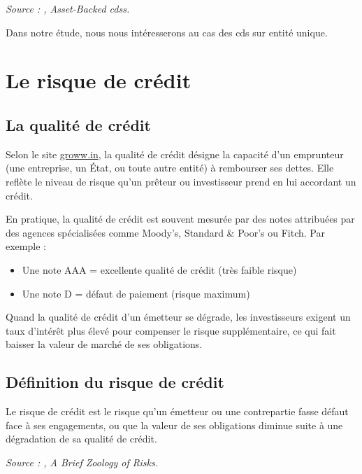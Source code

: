 \noindent\textit{Source : \cite{credit_default_swap}, Asset-Backed \gls{cds}s.}

\medskip

\noindent Dans notre étude, nous nous intéresserons au cas des \gls{cds} sur entité unique.


\section{Le risque de crédit}

\subsection{La qualité de crédit}

\begin{definition}
    Selon le site \href{https://groww.in/p/average-credit-quality}{groww.in}, la qualité de crédit désigne la capacité d'un emprunteur (une entreprise, un État, ou toute autre entité) à rembourser ses dettes. Elle reflète le niveau de risque qu'un prêteur ou investisseur prend en lui accordant un crédit.
\end{definition}

En pratique, la qualité de crédit est souvent mesurée par des notes attribuées par des agences spécialisées comme Moody's, Standard \& Poor's ou Fitch. Par exemple :

\begin{itemize}
    \item Une note AAA = excellente qualité de crédit (très faible risque)
    \item Une note D = défaut de paiement (risque maximum)
\end{itemize}

Quand la qualité de crédit d'un émetteur se dégrade, les investisseurs exigent un taux d'intérêt plus élevé pour compenser le risque supplémentaire, ce qui fait baisser la valeur de marché de ses obligations.

\subsection{Définition du risque de crédit}
Le risque de crédit est le risque qu'un émetteur ou une contrepartie fasse défaut face à ses engagements, ou que la valeur de ses obligations diminue suite à une dégradation de sa qualité de crédit.

\noindent\textit{Source : \cite{credit_risk},  A Brief Zoology of Risks.}

